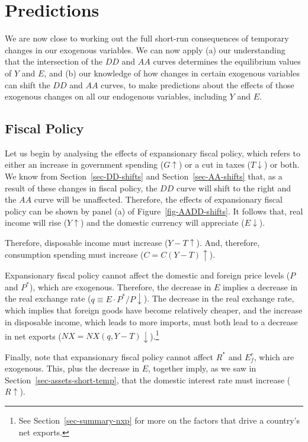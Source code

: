 \documentclass[
  letterpaper,
]{book}
\theoremstyle{plain}
\theoremstyle{remark}
\begin{document}
\section{Predictions}\label{sec-short-temp-preds}

We are now close to working out the full short-run consequences of
temporary changes in our exogenous variables. We can now apply (a) our
understanding that the intersection of the \(DD\) and \(AA\) curves
determines the equilibrium values of \(Y\) and \(E\), and (b) our
knowledge of how changes in certain exogenous variables can shift the
\(DD\) and \(AA\) curves, to make predictions about the effects of those
exogenous changes on all our endogenous variables, including \(Y\) and
\(E\).

\subsection{Fiscal Policy}\label{sec-fiscal-short-temp}

Let us begin by analysing the effects of expansionary fiscal policy,
which refers to either an increase in government spending
(\(G\uparrow\)) or a cut in taxes (\(T\downarrow\)) or both. We know
from Section~\ref{sec-DD-shifts} and Section~\ref{sec-AA-shifts} that,
as a result of these changes in fiscal policy, the \(DD\) curve will
shift to the right and the \(AA\) curve will be unaffected. Therefore,
the effects of expansionary fiscal policy can be shown by panel (a) of
Figure~\ref{fig-AADD-shifts}. It follows that, real income will rise
(\(Y\uparrow\)) and the domestic currency will appreciate
(\(E\downarrow\)).

Therefore, disposable income must increase (\(Y-T\uparrow\)). And,
therefore, consumption spending must increase (\(C=C(Y-T)\uparrow\)).

Expansionary fiscal policy cannot affect the domestic and foreign price
levels (\(P\) and \(P^*\)), which are exogenous. Therefore, the decrease
in \(E\) implies a decrease in the real exchange rate
(\(q\equiv E\cdot P^*/P\downarrow\)). The decrease in the real exchange
rate, which implies that foreign goods have become relatively cheaper,
and the increase in disposable income, which leads to more imports, must
both lead to a decrease in net exports
(\(NX=NX(q, Y-T)\downarrow\)).\footnote{See
  Section~\ref{sec-summary-nxp} for more on the factors that drive a
  country's net exports.}

Finally, note that expansionary fiscal policy cannot affect \(R^*\) and
\(E_f^e\), which are exogenous. This, plus the decrease in \(E\),
together imply, as we saw in Section~\ref{sec-assets-short-temp}, that
the domestic interest rate must increase (\(R\uparrow\)).
\end{document}
